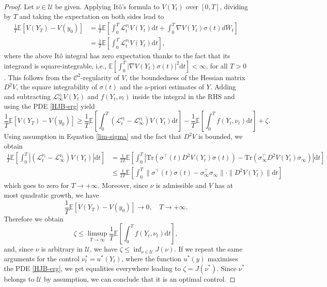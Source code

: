 \documentclass[a4paper,10pt]{article}
\newcommand{\D}{\mathrm{d}}
\theoremstyle{definition}
\theoremstyle{plain}
\numberwithin{equation}{section}
\begin{document}
\begin{proof} Let $\nu \in \mathcal U$ be given. Applying It\^o's formula to $V(Y_t)$ over $[0,T]$, dividing by $T$ and taking the expectation on both sides lead to
\begin{align*}
\frac{1}{T} \mathbb E [ V(Y_T) - V(y_0)] &= \frac{1}{T} \mathbb E\left[\int_0 ^T \mathcal L_t ^{\nu_t} V(Y_t) \D t +\int_0 ^T \nabla V(Y_t) \sigma(t) d \overline W_t \right] \\
& = \frac{1}{T} \mathbb E\left[\int_0 ^T \mathcal L_t ^{\nu_t} V(Y_t) \D t \right],
\end{align*}
where the above It\^o integral has zero expectation thanks to the fact that its integrand is square-integrable, i.e., $\mathbb E[\int_0 ^T |\nabla V(Y_t) \sigma(t)|^2 \D t]< \infty$, for all $T>0$. This follows from the $\mathcal C^2$-regularity of $V$, the boundedness of the Hessian matrix $D^2 V$, the square integrability of $\sigma(t)$ and the a-priori estimates of $Y$.
Adding and subtracting $\mathcal L_\infty ^{\nu_t} V(Y_t)$ and $f(Y_t, \nu_t)$ inside the integral in the RHS and using the PDE \eqref{HJB-erg} yield
\[ \frac{1}{T} \mathbb E [ V(Y_T) - V(y_0)] \geq \frac{1}{T} \mathbb E\left[\int_0 ^T (\mathcal L_t ^{\nu_t} - \mathcal L_\infty ^{\nu_t})V(Y_t) \D t \right] - \frac{1}{T} \mathbb E\left[\int_0 ^T f(Y_t, \nu_t) \D t\right] + \zeta.\]
Using assumption in Equation \eqref{lim-sigma} and the fact that $D^2 V$ is bounded, we obtain
\begin{align*}
\frac{1}{T} \mathbb E\left[\int_0 ^T |(\mathcal L_t ^{\nu_t} - \mathcal L_\infty ^{\nu_t})V(Y_t)| \D t \right] & = \frac{1}{2T} \mathbb E\left[\int_0 ^T |\textrm{Tr} \left( \sigma^\top(t) D^2 V(Y_t) \sigma(t) \right) - \textrm{Tr} \left( \sigma^\top _\infty D^2 V(Y_t) \sigma_\infty \right)| \D t \right] \\
& \le  \frac{1}{2T} \mathbb E\left[\int_0 ^T \| \sigma^\top (t)\sigma (t) - \sigma^\top _\infty \sigma_\infty \| \cdot \| D^2 V(Y_t)\| \D t \right] 
\end{align*}
which goes to zero for $T \to +\infty$.
Moreover, since $\nu$ is admissible and $V$ has at most quadratic growth, we have 
\[ \frac{1}{T} \mathbb E [ V(Y_T) - V(y_0)] \to 0, \quad T \to +\infty.\]
Therefore we obtain
\[ \zeta \leq \limsup_{T \to \infty} \frac{1}{T} \mathbb E\left[\int_0 ^T f(Y_t, \nu_t) \D t\right],\]
and, since $\nu$ is arbitrary in $\mathcal U$, we have $\zeta \leq \inf_{\nu \in \mathcal U} J(\nu)$. If we repeat the same arguments for the control $\nu^*_t = u^*(Y_t)$, where the function $u^*(y)$ maximises the PDE \eqref{HJB-erg}, we get equalities everywhere leading to $\zeta = J(\nu^*)$. Since $\nu ^*$ belongs to $\mathcal U$ by assumption, we can conclude that it is an optimal control.
\end{proof}
\end{document}
